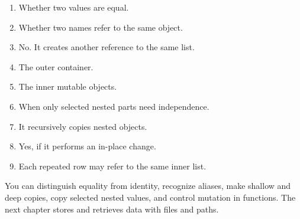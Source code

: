 
\begin{enumerate}
    \item Whether two values are equal.
    \item Whether two names refer to the same object.
    \item No. It creates another reference to the same list.
    \item The outer container.
    \item The inner mutable objects.
    \item When only selected nested parts need independence.
    \item It recursively copies nested objects.
    \item Yes, if it performs an in-place change.
    \item Each repeated row may refer to the same inner list.
\end{enumerate}

\begin{tcolorbox}[title=Chapter summary,colframe=orange,colback=white,arc=2mm]
You can distinguish equality from identity, recognize aliases, make shallow and
deep copies, copy selected nested values, and control mutation in functions.
The next chapter stores and retrieves data with files and paths.
\end{tcolorbox}

